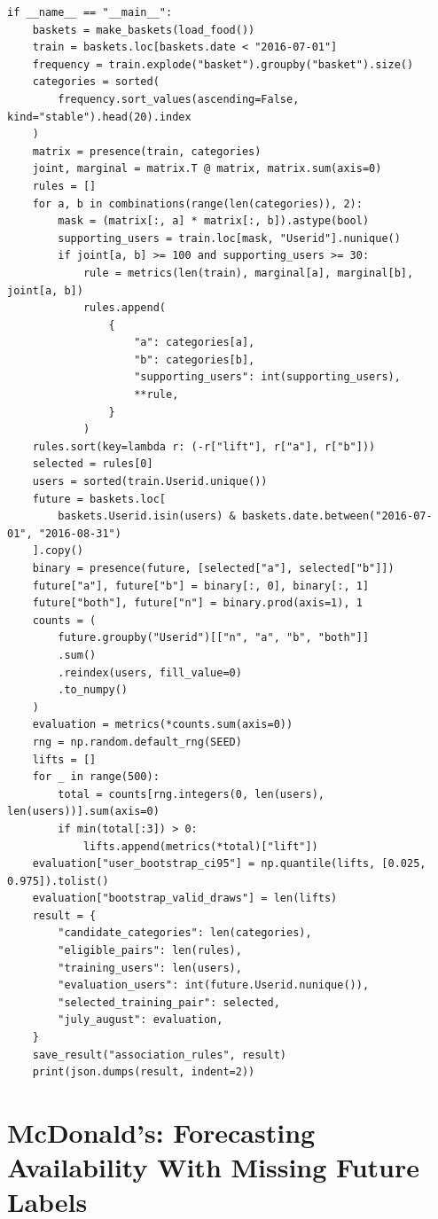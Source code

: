 \begin{Verbatim}[breaklines,breakanywhere,fontsize=\small]
if __name__ == "__main__":
    baskets = make_baskets(load_food())
    train = baskets.loc[baskets.date < "2016-07-01"]
    frequency = train.explode("basket").groupby("basket").size()
    categories = sorted(
        frequency.sort_values(ascending=False, kind="stable").head(20).index
    )
    matrix = presence(train, categories)
    joint, marginal = matrix.T @ matrix, matrix.sum(axis=0)
    rules = []
    for a, b in combinations(range(len(categories)), 2):
        mask = (matrix[:, a] * matrix[:, b]).astype(bool)
        supporting_users = train.loc[mask, "Userid"].nunique()
        if joint[a, b] >= 100 and supporting_users >= 30:
            rule = metrics(len(train), marginal[a], marginal[b], joint[a, b])
            rules.append(
                {
                    "a": categories[a],
                    "b": categories[b],
                    "supporting_users": int(supporting_users),
                    **rule,
                }
            )
    rules.sort(key=lambda r: (-r["lift"], r["a"], r["b"]))
    selected = rules[0]
    users = sorted(train.Userid.unique())
    future = baskets.loc[
        baskets.Userid.isin(users) & baskets.date.between("2016-07-01", "2016-08-31")
    ].copy()
    binary = presence(future, [selected["a"], selected["b"]])
    future["a"], future["b"] = binary[:, 0], binary[:, 1]
    future["both"], future["n"] = binary.prod(axis=1), 1
    counts = (
        future.groupby("Userid")[["n", "a", "b", "both"]]
        .sum()
        .reindex(users, fill_value=0)
        .to_numpy()
    )
    evaluation = metrics(*counts.sum(axis=0))
    rng = np.random.default_rng(SEED)
    lifts = []
    for _ in range(500):
        total = counts[rng.integers(0, len(users), len(users))].sum(axis=0)
        if min(total[:3]) > 0:
            lifts.append(metrics(*total)["lift"])
    evaluation["user_bootstrap_ci95"] = np.quantile(lifts, [0.025, 0.975]).tolist()
    evaluation["bootstrap_valid_draws"] = len(lifts)
    result = {
        "candidate_categories": len(categories),
        "eligible_pairs": len(rules),
        "training_users": len(users),
        "evaluation_users": int(future.Userid.nunique()),
        "selected_training_pair": selected,
        "july_august": evaluation,
    }
    save_result("association_rules", result)
    print(json.dumps(result, indent=2))
\end{Verbatim}

\hypertarget{M07-mcdonalds-forecasting-availability-with-missing-future-labels}{%
\section{McDonald's: Forecasting Availability With Missing Future
Labels}\label{M07-mcdonalds-forecasting-availability-with-missing-future-labels}}

